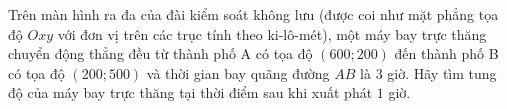 \begin{bt}%
	Trên màn hình ra đa của đài kiểm soát không lưu (được coi như mặt phẳng tọa độ $Oxy$ với đơn vị trên các trục tính theo ki-lô-mét), một máy bay trực thăng chuyển động thẳng đều từ thành phố A có tọa độ $(600;200)$ đến thành phố B có tọa độ $(200;500)$ và thời gian bay quãng đường $AB$ là $3$ giờ. Hãy tìm tung độ của máy bay trực thăng tại thời điểm sau khi xuất phát $1$ giờ.
\end{bt}

